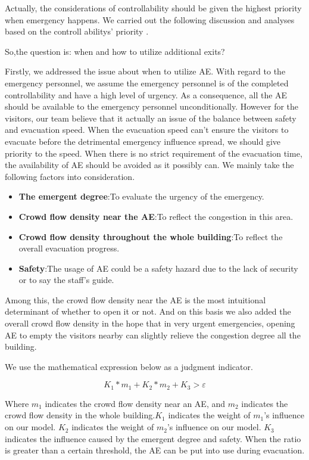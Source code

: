 \documentclass[12pt]{article}
\begin{document}
Actually, the considerations of controllability 
should be given the highest priority when emergency happens.\cite{19}
We carried out the following discussion and analyses based on the controll abilitys' priority .

So,the question is: when and how to utilize additional exits?

Firstly, we addressed the issue about when to utilize AE.
With regard to the emergency personnel, we assume the emergency 
personnel is of the completed controllability and have a high level of urgency. 
As a consequence, all the AE should be
available to the emergency personnel unconditionally.
However for the visitors, our team believe that it actually an issue 
of the balance between safety and evacuation speed. When the evacuation 
speed can't ensure the visitors to evacuate before the detrimental emergency 
influence spread, we should give priority to the speed.
When there is no strict requirement of the evacuation time, the 
availability of AE should be avoided as it possibly can. We mainly 
take the following factors into consideration.
\begin{itemize}
    \item \textbf{The emergent degree}:To evaluate the urgency of the emergency.
    \item \textbf{Crowd flow density near the AE}:To reflect the congestion in this area.
    \item \textbf{Crowd flow density throughout the whole building}:To reflect the overall evacuation progress.
    \item \textbf{Safety}:The usage of AE could be a safety hazard due to the lack of security or to say the staff's guide.
\end{itemize}

Among this, the crowd flow density near the AE is the most intuitional determinant of whether to open it or not. And on this basis we also added the overall crowd flow density in the hope that in very urgent emergencies, opening AE to empty the visitors nearby can slightly relieve the congestion degree all the building.


We use the mathematical expression below as a judgment indicator. 

\begin{equation}
	K_{1}*m_{1}+K_{2}*m_{2}+K_{3}>\varepsilon  \label{pythagorean}
\end{equation}
	
Where $m_{1}$ indicates the crowd flow density near an AE, and
$m_{2}$ indicates the crowd flow density in the whole building.$K_{1}$ indicates the weight of $m_{1}$'s influence on our model.
$K_{2}$ indicates the weight of $m_{2}$'s influence on our model. 
$K_{3}$ indicates the influence 
caused by the emergent degree and safety.
When the ratio is greater than a certain threshold,
the AE can be put into use during evacuation.
\end{document}
